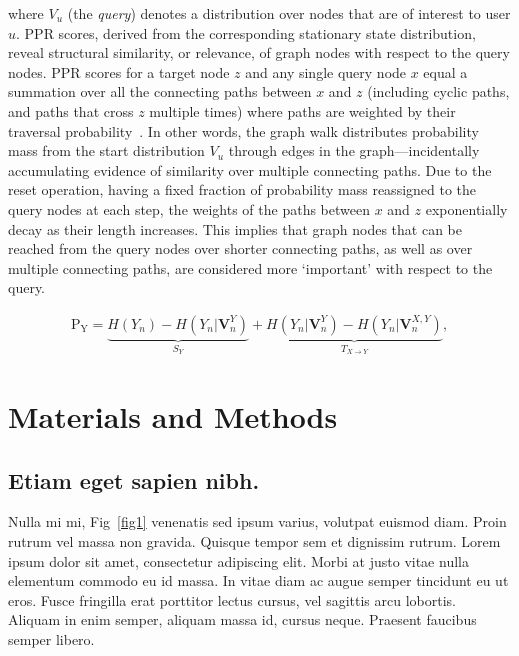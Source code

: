 \documentclass[10pt,letterpaper]{article}
\begin{document}
\noindent where $V_u$ (the \textit{query}) denotes a distribution over nodes that are of interest to user $u$. PPR scores, derived from the corresponding stationary state distribution, reveal structural similarity, or relevance, of graph nodes with respect to the query nodes. PPR scores for a target node $z$ and any single query node $x$ equal a summation over all the connecting paths between $x$ and $z$ (including cyclic paths, and paths that cross $z$ multiple times) where paths are weighted by their traversal probability~\cite{jeh2003scaling,fogaras2004towards}. In other words, the graph walk distributes probability mass from the start distribution $V_u$ through edges in the graph---incidentally accumulating evidence of similarity over multiple connecting paths. Due to the reset operation, having a fixed fraction of probability mass reassigned to the query nodes at each step, the weights of the paths between $x$ and $z$ exponentially decay as their length increases. This implies that graph nodes that can be reached from the query nodes over shorter connecting paths, as well as over multiple connecting paths, are considered more `important' with respect to the query.


\begin{eqnarray}
\label{eq:schemeP}
	\mathrm{P_Y} = \underbrace{H(Y_n) - H(Y_n|\mathbf{V}^{Y}_{n})}_{S_Y} + \underbrace{H(Y_n|\mathbf{V}^{Y}_{n})- H(Y_n|\mathbf{V}^{X,Y}_{n})}_{T_{X\rightarrow Y}},
\end{eqnarray}

\section*{Materials and Methods}
\subsection*{Etiam eget sapien nibh.}

Nulla mi mi, Fig~\ref{fig1} venenatis sed ipsum varius, volutpat euismod diam. Proin rutrum vel massa non gravida. Quisque tempor sem et dignissim rutrum. Lorem ipsum dolor sit amet, consectetur adipiscing elit. Morbi at justo vitae nulla elementum commodo eu id massa. In vitae diam ac augue semper tincidunt eu ut eros. Fusce fringilla erat porttitor lectus cursus,  vel sagittis arcu lobortis. Aliquam in enim semper, aliquam massa id, cursus neque. Praesent faucibus semper libero.
\end{document}
